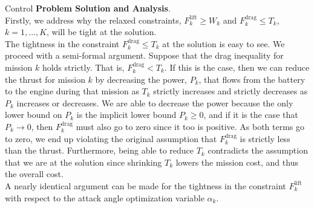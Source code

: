 \begin{chapter}{Control}
    \noindent\textbf{Problem Solution and Analysis}.\\
    \noindent Firstly, we address why the relaxed constraints, $F_{k}^{\mathrm{lift}} \ge W_k$ and $F_{k}^{\mathrm{drag}} \le T_k$,
    $k=1, \ldots, K$, will be tight at the solution.\\
    The tightness in the constraint $F_{k}^{\mathrm{drag}} \le T_k$ at the solution is easy to see. We proceed with a semi-formal argument.
    Suppose that the drag inequality for mission $k$ holds strictly. That is, $F_k^{\mathrm{drag}} < T_k$. If this is the case, then we can
    reduce the thrust for mission $k$ by decreasing the power, $P_k$, that flows from the battery to the engine
    during that mission as $T_k$ strictly increases and strictly decreases as $P_k$ increases or decreases.
    We are able to decrease the power because the only lower bound on $P_k$ is the implicit lower bound $P_k \ge 0$,
    and if it is the case that $P_k \to 0$, then $F_k^{\mathrm{drag}}$ must also go to zero since it too is positive. 
    As both terms go to zero, we end up violating the original assumption that $F_k^{\mathrm{drag}}$ is strictly less than the
    thrust. Furthermore, being able to reduce $T_k$ contradicts the assumption that we are at the solution since shrinking $T_k$
    lowers the mission cost, and thus the overall cost. \\
    \noindent A nearly identical argument can be made for the tightness in the constraint $F_k^{\mathrm{lift}}$ with
    respect to the attack angle optimization variable $\alpha_k$.


\end{chapter}
